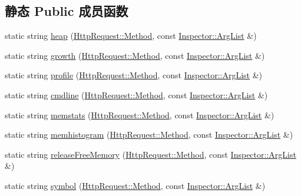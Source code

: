 \subsection*{静态 Public 成员函数}
\begin{DoxyCompactItemize}
\item 
static string \hyperlink{classmuduo_1_1net_1_1PerformanceInspector_aebbf0ee882ac01d8b418b071d2d418d4}{heap} (\hyperlink{classmuduo_1_1net_1_1HttpRequest_a2a3c0067e44c5ef3210a256d06c16b0f}{Http\+Request\+::\+Method}, const \hyperlink{classmuduo_1_1net_1_1Inspector_aa22799cd3b4f56688d431d68c2d014a0}{Inspector\+::\+Arg\+List} \&)
\item 
static string \hyperlink{classmuduo_1_1net_1_1PerformanceInspector_aaecd9a3d2a22f7bc68fe94c5517878fb}{growth} (\hyperlink{classmuduo_1_1net_1_1HttpRequest_a2a3c0067e44c5ef3210a256d06c16b0f}{Http\+Request\+::\+Method}, const \hyperlink{classmuduo_1_1net_1_1Inspector_aa22799cd3b4f56688d431d68c2d014a0}{Inspector\+::\+Arg\+List} \&)
\item 
static string \hyperlink{classmuduo_1_1net_1_1PerformanceInspector_ac46cb8f0c9149200e29de7ba10b4e33d}{profile} (\hyperlink{classmuduo_1_1net_1_1HttpRequest_a2a3c0067e44c5ef3210a256d06c16b0f}{Http\+Request\+::\+Method}, const \hyperlink{classmuduo_1_1net_1_1Inspector_aa22799cd3b4f56688d431d68c2d014a0}{Inspector\+::\+Arg\+List} \&)
\item 
static string \hyperlink{classmuduo_1_1net_1_1PerformanceInspector_a505901bf0cc96fc846e7d45116b9fb5c}{cmdline} (\hyperlink{classmuduo_1_1net_1_1HttpRequest_a2a3c0067e44c5ef3210a256d06c16b0f}{Http\+Request\+::\+Method}, const \hyperlink{classmuduo_1_1net_1_1Inspector_aa22799cd3b4f56688d431d68c2d014a0}{Inspector\+::\+Arg\+List} \&)
\item 
static string \hyperlink{classmuduo_1_1net_1_1PerformanceInspector_a1b4ce3a095b5f51da905d2bc497bbcb4}{memstats} (\hyperlink{classmuduo_1_1net_1_1HttpRequest_a2a3c0067e44c5ef3210a256d06c16b0f}{Http\+Request\+::\+Method}, const \hyperlink{classmuduo_1_1net_1_1Inspector_aa22799cd3b4f56688d431d68c2d014a0}{Inspector\+::\+Arg\+List} \&)
\item 
static string \hyperlink{classmuduo_1_1net_1_1PerformanceInspector_af628cc99d42350609dd5916dccc512e9}{memhistogram} (\hyperlink{classmuduo_1_1net_1_1HttpRequest_a2a3c0067e44c5ef3210a256d06c16b0f}{Http\+Request\+::\+Method}, const \hyperlink{classmuduo_1_1net_1_1Inspector_aa22799cd3b4f56688d431d68c2d014a0}{Inspector\+::\+Arg\+List} \&)
\item 
static string \hyperlink{classmuduo_1_1net_1_1PerformanceInspector_a76ebee8151ab3a7d0006c95caa4407d3}{release\+Free\+Memory} (\hyperlink{classmuduo_1_1net_1_1HttpRequest_a2a3c0067e44c5ef3210a256d06c16b0f}{Http\+Request\+::\+Method}, const \hyperlink{classmuduo_1_1net_1_1Inspector_aa22799cd3b4f56688d431d68c2d014a0}{Inspector\+::\+Arg\+List} \&)
\item 
static string \hyperlink{classmuduo_1_1net_1_1PerformanceInspector_ab52d0c847bce43680fbb4845e8f78a19}{symbol} (\hyperlink{classmuduo_1_1net_1_1HttpRequest_a2a3c0067e44c5ef3210a256d06c16b0f}{Http\+Request\+::\+Method}, const \hyperlink{classmuduo_1_1net_1_1Inspector_aa22799cd3b4f56688d431d68c2d014a0}{Inspector\+::\+Arg\+List} \&)
\end{DoxyCompactItemize}
